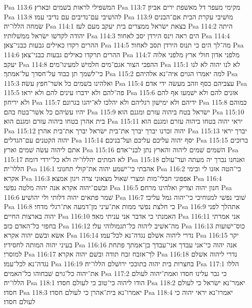 Psa 113:6  המשׁפילי לראות בשׁמים ובארץ׃
Psa 113:7  מקימי מעפר דל מאשׁפת ירים אביון׃
Psa 113:8  להושׁיבי עם־נדיבים עם נדיבי עמו׃
Psa 113:9  מושׁיבי עקרת הבית אם־הבנים שׂמחה הללו־יה׃
Psa 114:1  בצאת ישׂראל ממצרים בית יעקב מעם לעז׃
Psa 114:2  היתה יהודה לקדשׁו ישׂראל ממשׁלותיו׃
Psa 114:3  הים ראה וינס הירדן יסב לאחור׃
Psa 114:4  ההרים רקדו כאילים גבעות כבני־צאן׃
Psa 114:5  מה־לך הים כי תנוס הירדן תסב לאחור׃
Psa 114:6  ההרים תרקדו כאילים גבעות כבני־צאן׃
Psa 114:7  מלפני אדון חולי ארץ מלפני אלוה יעקב׃
Psa 114:8  ההפכי הצור אגם־מים חלמישׁ למעינו־מים׃
Psa 115:1  לא לנו יהוה לא לנו כי־לשׁמך תן כבוד על־חסדך על־אמתך׃
Psa 115:2  למה יאמרו הגוים איה־נא אלהיהם׃
Psa 115:3  ואלהינו בשׁמים כל אשׁר־חפץ עשׂה׃
Psa 115:4  עצביהם כסף וזהב מעשׂה ידי אדם׃
Psa 115:5  פה־להם ולא ידברו עינים להם ולא יראו׃
Psa 115:6  אזנים להם ולא ישׁמעו אף להם ולא יריחון׃
Psa 115:7  ידיהם ולא ימישׁון רגליהם ולא יהלכו לא־יהגו בגרונם׃
Psa 115:8  כמוהם יהיו עשׂיהם כל אשׁר־בטח בהם׃
Psa 115:9  ישׂראל בטח ביהוה עזרם ומגנם הוא׃
Psa 115:10  בית אהרן בטחו ביהוה עזרם ומגנם הוא׃
Psa 115:11  יראי יהוה בטחו ביהוה עזרם ומגנם הוא׃
Psa 115:12  יהוה זכרנו יברך יברך את־בית ישׂראל יברך את־בית אהרן׃
Psa 115:13  יברך יראי יהוה הקטנים עם־הגדלים׃
Psa 115:14  יסף יהוה עליכם עליכם ועל־בניכם׃
Psa 115:15  ברוכים אתם ליהוה עשׂה שׁמים וארץ׃
Psa 115:16  השׁמים שׁמים ליהוה והארץ נתן לבני־אדם׃
Psa 115:17  לא המתים יהללו־יה ולא כל־ירדי דומה׃
Psa 115:18  ואנחנו נברך יה מעתה ועד־עולם הללו־יה׃
Psa 116:1  אהבתי כי־ישׁמע יהוה את־קולי תחנוני׃
Psa 116:2  כי־הטה אזנו לי ובימי אקרא׃
Psa 116:3  אפפוני חבלי־מות ומצרי שׁאול מצאוני צרה ויגון אמצא׃
Psa 116:4  ובשׁם־יהוה אקרא אנה יהוה מלטה נפשׁי׃
Psa 116:5  חנון יהוה וצדיק ואלהינו מרחם׃
Psa 116:6  שׁמר פתאים יהוה דלותי ולי יהושׁיע׃
Psa 116:7  שׁובי נפשׁי למנוחיכי כי־יהוה גמל עליכי׃
Psa 116:8  כי חלצת נפשׁי ממות את־עיני מן־דמעה את־רגלי מדחי׃
Psa 116:9  אתהלך לפני יהוה בארצות החיים׃
Psa 116:10  האמנתי כי אדבר אני עניתי מאד׃
Psa 116:11  אני אמרתי בחפזי כל־האדם כזב׃
Psa 116:12  מה־אשׁיב ליהוה כל־תגמולוהי עלי׃
Psa 116:13  כוס־ישׁועות אשׂא ובשׁם יהוה אקרא׃
Psa 116:14  נדרי ליהוה אשׁלם נגדה־נא לכל־עמו׃
Psa 116:15  יקר בעיני יהוה המותה לחסידיו׃
Psa 116:16  אנה יהוה כי־אני עבדך אני־עבדך בן־אמתך פתחת למוסרי׃
Psa 116:17  לך־אזבח זבח תודה ובשׁם יהוה אקרא׃
Psa 116:18  נדרי ליהוה אשׁלם נגדה־נא לכל־עמו׃
Psa 116:19  בחצרות בית יהוה בתוככי ירושׁלם הללו־יה׃
Psa 117:1  הללו את־יהוה כל־גוים שׁבחוהו כל־האמים׃
Psa 117:2  כי גבר עלינו חסדו ואמת־יהוה לעולם הללו־יה׃
Psa 118:1  הודו ליהוה כי־טוב כי לעולם חסדו׃
Psa 118:2  יאמר־נא ישׂראל כי לעולם חסדו׃
Psa 118:3  יאמרו־נא בית־אהרן כי לעולם חסדו׃
Psa 118:4  יאמרו־נא יראי יהוה כי לעולם חסדו׃
